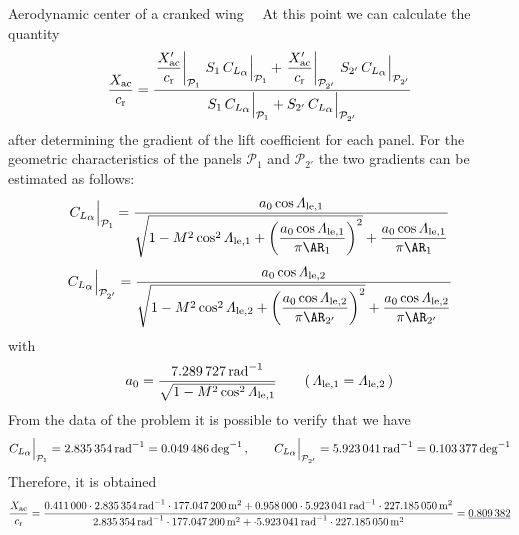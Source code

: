 \documentclass[[12pt,twoside]{book}
\begin{document}
\begin{myExampleX}{Aerodynamic center of a cranked wing}{\ \myIconGraph\ }
At this point we can calculate the quantity
\[
\frac{X_{\mathrm{ac}}}{c_\mathrm{r}}
  = \frac{
    \left.\dfrac{X'_{\mathrm{ac}}}{c_\mathrm{r}}\right|_{\mathcal{P}_{1}}
      \, S_{1} \, C_{L_\mathlarger{\alpha}}\Big|_{\mathcal{P}_{1}}
    +
    \left.\dfrac{X'_{\mathrm{ac}}}{c_\mathrm{r}}\right|_{\mathcal{P}_{2'}}
      \, S_{2'} \, C_{L_\mathlarger{\alpha}}\Big|_{\mathcal{P}_{2'}}
  }{
    S_{1} \, C_{L_\mathlarger{\alpha}}\Big|_{\mathcal{P}_{1}} 
    + S_{2'} \, C_{L_\mathlarger{\alpha}}\Big|_{\mathcal{P}_{2'}} 
  }
\]
after determining the gradient of the lift coefficient for each panel.
For the geometric characteristics of the panels $\mathcal{P}_{1}$ and
$\mathcal{P}_{2'}$ the two gradients can be estimated as follows:
\[
C_{L_\mathlarger{\alpha}}\Big|_{\mathcal{P}_{1}}
  =
  \frac{
    a_0 \cos \Lambda_{\mathrm{le,1}}
  }{
    \sqrt{
      1 - \Mach^2 \cos^2 \Lambda_{\mathrm{le,1}}
        + \left( \dfrac{ a_0 \cos \Lambda_{\mathrm{le,1}} }{ \pi \AR_1} \right)^2
    }
    +
    \dfrac{ a_0 \cos \Lambda_{\mathrm{le,1}} }{ \pi \AR_1}
  }
\]
\[
C_{L_\mathlarger{\alpha}}\Big|_{\mathcal{P}_{2'}}
  =
  \frac{
    a_0 \cos \Lambda_{\mathrm{le,2}}
  }{
    \sqrt{
      1 - \Mach^2 \cos^2 \Lambda_{\mathrm{le,2}}
        + \left( \dfrac{ a_0 \cos \Lambda_{\mathrm{le,2}} }{ \pi \AR_{2'}} \right)^2
    }
    +
    \dfrac{ a_0 \cos \Lambda_{\mathrm{le,2}} }{ \pi \AR_{2'}}
  }
\]
with
\[
a_0 = 
  \frac{
    \SI[round-precision=3]{\myCLAlphaAtMACWingRAD}{\radian^{-1}}
  }{
    \sqrt{ 1 - \Mach^2 \cos^2 \Lambda_{\mathrm{le,1}} }
  }
  \qquad (\, \Lambda_{\mathrm{le,1}} = \Lambda_{\mathrm{le,2}} \,)
\]
From the data of the problem it is possible to verify that we have
\[
C_{L_\mathlarger{\alpha}}\Big|_{\mathcal{P}_{1}}
  = \SI[round-precision=3]{\myCLAlphaPolhamusWingIRAD}{\radian^{-1}}
  = \SI[round-precision=4]{\myCLAlphaPolhamusWingIDEG}{\deg^{-1}}
\,,
\qquad
C_{L_\mathlarger{\alpha}}\Big|_{\mathcal{P}_{2'}}
  = \SI[round-precision=3]{\myCLAlphaPolhamusWingIIRAD}{\radian^{-1}}
  = \SI[round-precision=4]{\myCLAlphaPolhamusWingIIDEG}{\deg^{-1}}
\]
Therefore, it is obtained
\[
\frac{X_{\mathrm{ac}}}{c_\mathrm{r}}
  = \frac{
    \SI[round-precision=3]{\myXACOverChordRootDatcomWingI}{}
    \cdot \SI[round-precision=3]{\myCLAlphaPolhamusWingIRAD}{\radian^{-1}}
    \cdot \SI[round-precision=1]{\myAreaWingIMTsquared}{\metre^{2}}
    +
    \SI[round-precision=3]{\myXACOverChordRootDatcomWingII}{}
    \cdot \SI[round-precision=3]{\myCLAlphaPolhamusWingIIRAD}{\radian^{-1}}
    \cdot \SI[round-precision=1]{\myAreaWingIIPrimeMTsquared}{\metre^{2}}
  }{
    \SI[round-precision=3]{\myCLAlphaPolhamusWingIRAD}{\radian^{-1}}
    \cdot \SI[round-precision=1]{\myAreaWingIMTsquared}{\metre^{2}}
    +
    \cdot \SI[round-precision=3]{\myCLAlphaPolhamusWingIIRAD}{\radian^{-1}}
    \cdot \SI[round-precision=1]{\myAreaWingIIPrimeMTsquared}{\metre^{2}}  
  }
  = 
  \mathunderline{mydarkblue}{ \SI[round-precision=3]{\myXACOverChordRootDatcomWing}{} }
\]


\end{myExampleX}
\end{document}
